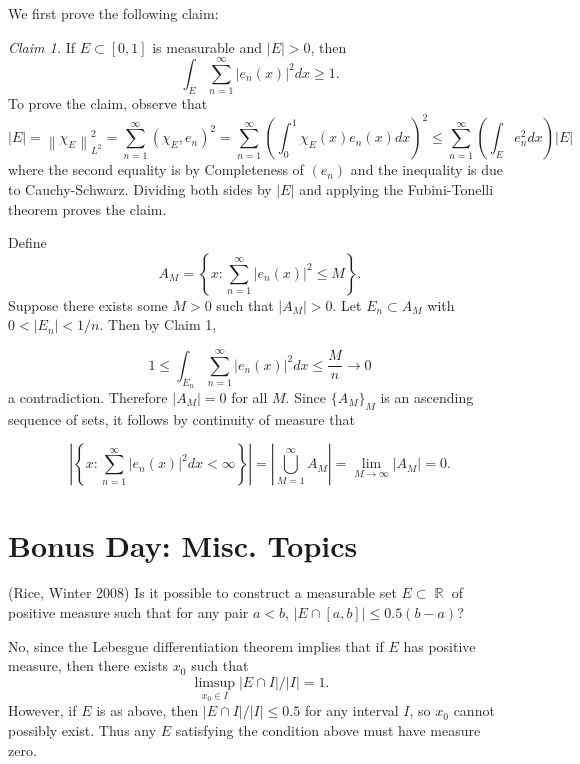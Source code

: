\documentclass{exam}
\DeclareMathOperator{\RR}{\mathbb{R}}
\theoremstyle{problemstyle}
\newcommand{\norm}[1]{\left\lVert#1\right\rVert} %
\newcommand{\1}[1]{\textbf{1}_{\left[#1\right]}} %
\def\({\left (}
\def\){\right )}
\begin{document}
\begin{questions}
\begin{parts}
\begin{solution}
We first prove the following claim: 

  \textit{Claim 1.} If $E\subset [0,1]$ is measurable and $|E|>0$, then
  \begin{equation*}
    \int_{E} \sum_{n=1}^{\infty} \left| e_{n}(x) \right|^{2}dx \geq 1.
  \end{equation*}
  To prove the claim, observe that
  \begin{equation*}
    |E|= \norm{\chi_{E}}_{L^{2}}^{2}  = \sum_{n=1}^{\infty} (\chi_{E},e_{n})^{2} = \sum_{n=1}^{\infty} \left( \int_0^{1}\chi_{E}(x) e_{n}(x)dx \right)^{2}\leq \sum_{n=1}^{\infty} \(\int_{E} e_{n}^{2}dx \) |E|
  \end{equation*}
  where the second equality is by Completeness of $(e_{n})$ and the inequality is due to Cauchy-Schwarz. Dividing both sides by $|E|$ and applying the Fubini-Tonelli theorem proves the claim.

  Define
  \begin{equation*}
  A_M = \left\{ x:  \sum_{n=1}^{\infty} |e_n(x)|^2 \leq M\right\}.
  \end{equation*}
  Suppose there exists some $M>0$ such that $|A_M|>0$. Let $E_n\subset A_M$ with $0<|E_n|<1/n$. Then by Claim 1,
  
  $$1\leq \int_{E_n} \sum_{n=1}^{\infty} \left| e_{n}(x) \right|^{2}dx \leq \frac{M}{n} \to 0$$
  a contradiction. Therefore $|A_M|=0$ for all $M$. Since $\{A_M\}_M$ is an ascending sequence of sets, it follows by continuity of measure that
  
  $$\left|\left\{x: \sum_{n=1}^{\infty} |e_n(x)|^2 dx <\infty\right\}\right|=\left|\bigcup_{M=1}^{\infty} A_M\right| = \lim_{M\to\infty} |A_M| =0.$$
\end{solution}
\end{parts}





\newpage
\section{Bonus Day: Misc. Topics}

\question (Rice, Winter 2008) Is it possible to construct a measurable set $E \subset \RR$ of positive measure such that for any pair $a < b$, $|E \cap [a,b]| \leq 0.5 (b - a)$?
\begin{solution}
    No, since the Lebesgue differentiation theorem implies that if $E$ has positive measure, then there exists $x_0$ such that
    \[ \limsup_{x_0 \in I} |E \cap I|/|I| = 1. \]
    However, if $E$ is as above, then $|E \cap I| / |I| \leq 0.5$ for any interval $I$, so $x_0$ cannot possibly exist. Thus any $E$ satisfying the condition above must have measure zero.
\end{solution}


\end{questions}
\end{document}
